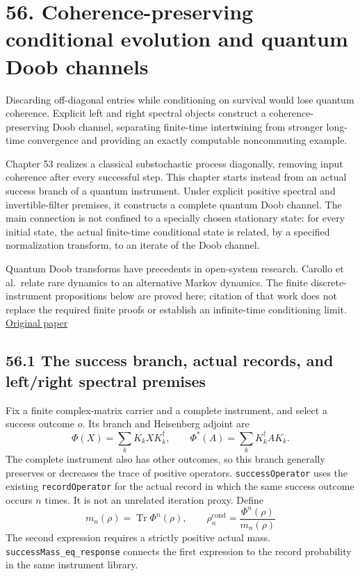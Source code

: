 \documentclass[
  11pt,
  oneside]{book}
\begin{document}
\chapter{56. Coherence-preserving conditional evolution and quantum Doob
channels}\label{ch-56}

Discarding off-diagonal entries while conditioning on survival would
lose quantum coherence. Explicit left and right spectral objects
construct a coherence-preserving Doob channel, separating finite-time
intertwining from stronger long-time convergence and providing an
exactly computable noncommuting example.

Chapter 53 realizes a classical substochastic process diagonally,
removing input coherence after every successful step. This chapter
starts instead from an actual success branch of a quantum instrument.
Under explicit positive spectral and invertible-filter premises, it
constructs a complete quantum Doob channel. The main connection is not
confined to a specially chosen stationary state: for every initial
state, the actual finite-time conditional state is related, by a
specified normalization transform, to an iterate of the Doob channel.

Quantum Doob transforms have precedents in open-system research. Carollo
et al.~relate rare dynamics to an alternative Markov dynamics. The
finite discrete-instrument propositions below are proved here; citation
of that work does not replace the required finite proofs or establish an
infinite-time conditioning limit.
\href{https://arxiv.org/abs/1711.10951}{Original paper}

\section{56.1 The success branch, actual records, and left/right
spectral premises}

Fix a finite complex-matrix carrier and a complete instrument, and
select a success outcome \(o\). Its branch and Heisenberg adjoint are \[
\Phi(X)=\sum_kK_kXK_k^\dagger,
\qquad \Phi^*(A)=\sum_kK_k^\dagger AK_k.
\] The complete instrument also has other outcomes, so this branch
generally preserves or decreases the trace of positive operators.
\texttt{success\allowbreak Operator} uses the existing \texttt{record\allowbreak Operator} for
the actual record in which the same success outcome occurs \(n\) times.
It is not an unrelated iteration proxy. Define \[
m_n(\rho)=\operatorname{Tr}\Phi^n(\rho),\qquad
\rho_n^{\mathrm{cond}}=\frac{\Phi^n(\rho)}{m_n(\rho)}
\] The second expression requires a strictly positive actual mass.
\texttt{success\allowbreak Mass\_\allowbreak eq\_\allowbreak response} connects the first expression to the
record probability in the same instrument library.
\end{document}
